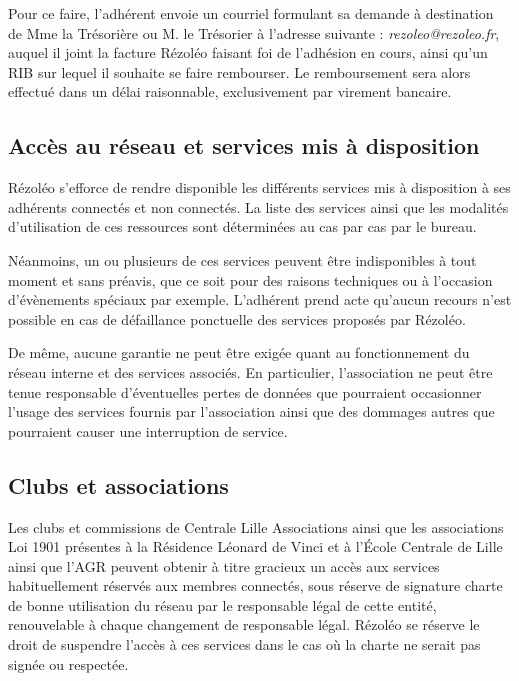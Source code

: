 \documentclass[12pt, a4paper]{article}
\begin{document}
	\bigskip

	Pour ce faire, l'adhérent envoie un courriel formulant sa demande à destination
	de Mme la Trésorière ou M. le Trésorier à l'adresse suivante : \textit{rezoleo@rezoleo.fr},
	auquel il joint la facture Rézoléo faisant foi de l'adhésion en cours, ainsi qu'un
	RIB sur lequel il souhaite se faire rembourser. Le remboursement sera alors effectué
    dans un délai raisonnable, exclusivement par virement bancaire.

	\subsection{Accès au réseau et services mis à disposition}

	Rézoléo s'efforce de rendre disponible les différents services mis à
	disposition à ses adhérents connectés et non connectés. La liste des services ainsi
	que les modalités d'utilisation de ces ressources sont déterminées au cas par cas
	par le bureau.

	\bigskip

	Néanmoins, un ou plusieurs de ces services peuvent être indisponibles à tout moment
	et sans préavis, que ce soit pour des raisons techniques ou à l'occasion d'évènements
	spéciaux par exemple. L'adhérent prend acte qu'aucun recours n'est possible en
	cas de défaillance ponctuelle des services proposés par Rézoléo.

	\bigskip

	De même, aucune garantie ne peut être exigée quant au fonctionnement du réseau
	interne et des services associés. En particulier, l'association ne peut être tenue
	responsable d'éventuelles pertes de données que pourraient occasionner l'usage
	des services fournis par l'association ainsi que des dommages autres que pourraient
	causer une interruption de service.

	\subsection{Clubs et associations}

	Les clubs et commissions de Centrale Lille Associations ainsi que les
	associations Loi 1901 présentes à la Résidence Léonard de Vinci et à l'École
	Centrale de Lille ainsi que l'AGR peuvent
	obtenir à titre gracieux un accès aux services habituellement réservés aux
	membres connectés, sous réserve de signature charte de bonne utilisation du réseau
	par le responsable légal de cette entité, renouvelable à chaque changement de
	responsable légal. Rézoléo se réserve le droit de suspendre l'accès à ces services
	dans le cas où la charte ne serait pas signée ou respectée.
\end{document}
